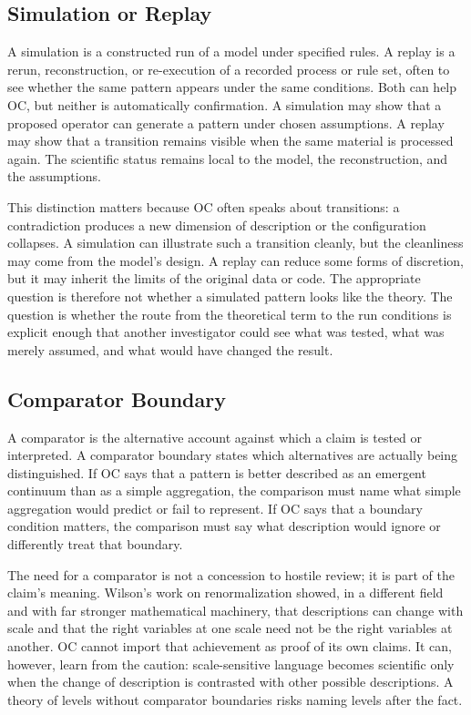 \documentclass[11pt,a4paper,openany]{book}
\begin{document}
\subsection{Simulation or Replay}
A simulation is a constructed run of a model under specified rules. A replay is a rerun, reconstruction, or re-execution of a recorded process or rule set, often to see whether the same pattern appears under the same conditions. Both can help OC, but neither is automatically confirmation. A simulation may show that a proposed operator can generate a pattern under chosen assumptions. A replay may show that a transition remains visible when the same material is processed again. The scientific status remains local to the model, the reconstruction, and the assumptions. \cite{wilson_renormalization,landau_stat_physics}\par
This distinction matters because OC often speaks about transitions: a contradiction produces a new dimension of description or the configuration collapses. A simulation can illustrate such a transition cleanly, but the cleanliness may come from the model's design. A replay can reduce some forms of discretion, but it may inherit the limits of the original data or code. The appropriate question is therefore not whether a simulated pattern looks like the theory. The question is whether the route from the theoretical term to the run conditions is explicit enough that another investigator could see what was tested, what was merely assumed, and what would have changed the result.\par
\subsection{Comparator Boundary}
A comparator is the alternative account against which a claim is tested or interpreted. A comparator boundary states which alternatives are actually being distinguished. If OC says that a pattern is better described as an emergent continuum than as a simple aggregation, the comparison must name what simple aggregation would predict or fail to represent. If OC says that a boundary condition matters, the comparison must say what description would ignore or differently treat that boundary. \cite{wilson_renormalization,landau_stat_physics}\par
The need for a comparator is not a concession to hostile review; it is part of the claim's meaning. Wilson's work on renormalization showed, in a different field and with far stronger mathematical machinery, that descriptions can change with scale and that the right variables at one scale need not be the right variables at another. OC cannot import that achievement as proof of its own claims. It can, however, learn from the caution: scale-sensitive language becomes scientific only when the change of description is contrasted with other possible descriptions. A theory of levels without comparator boundaries risks naming levels after the fact.\par
\end{document}
